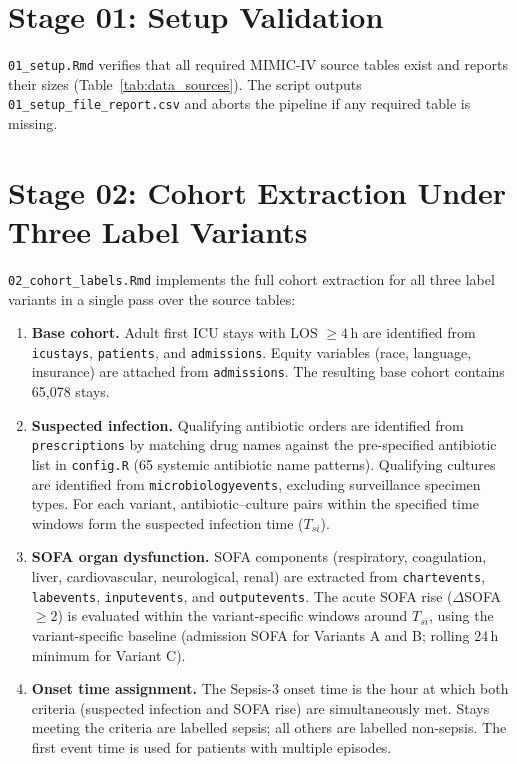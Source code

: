 \section{Stage 01: Setup Validation}

\texttt{01\_setup.Rmd} verifies that all required MIMIC-IV source tables exist and
reports their sizes (Table~\ref{tab:data_sources}). The script outputs
\texttt{01\_setup\_file\_report.csv} and aborts the pipeline if any required
table is missing.

\section{Stage 02: Cohort Extraction Under Three Label Variants}

\texttt{02\_cohort\_labels.Rmd} implements the full cohort extraction for all three
label variants in a single pass over the source tables:

\begin{enumerate}
  \item \textbf{Base cohort.} Adult first ICU stays with LOS $\geq 4$\,h are
  identified from \texttt{icustays}, \texttt{patients}, and \texttt{admissions}.
  Equity variables (race, language, insurance) are attached from \texttt{admissions}.
  The resulting base cohort contains 65{,}078 stays.

  \item \textbf{Suspected infection.} Qualifying antibiotic orders are identified
  from \texttt{prescriptions} by matching drug names against the pre-specified
  antibiotic list in \texttt{config.R} (65 systemic antibiotic name patterns).
  Qualifying cultures are identified from \texttt{microbiologyevents}, excluding
  surveillance specimen types. For each variant, antibiotic--culture pairs within
  the specified time windows form the suspected infection time ($T_{si}$).

  \item \textbf{SOFA organ dysfunction.} SOFA components (respiratory, coagulation,
  liver, cardiovascular, neurological, renal) are extracted from \texttt{chartevents},
  \texttt{labevents}, \texttt{inputevents}, and \texttt{outputevents}. The acute
  SOFA rise ($\Delta$SOFA $\geq 2$) is evaluated within the variant-specific
  windows around $T_{si}$, using the variant-specific baseline (admission SOFA for
  Variants A and B; rolling 24\,h minimum for Variant C).

  \item \textbf{Onset time assignment.} The Sepsis-3 onset time is the hour at
  which both criteria (suspected infection and SOFA rise) are simultaneously met.
  Stays meeting the criteria are labelled sepsis; all others are labelled
  non-sepsis. The first event time is used for patients with multiple episodes.
\end{enumerate}

